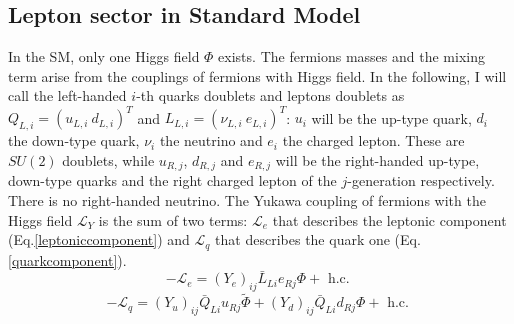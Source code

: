 \subsection{Lepton sector in Standard Model}\label{leptonsector}
In the SM, only one Higgs field $\Phi$ exists. The fermions masses and the mixing term arise from the couplings of fermions with Higgs field. In the following, I will call the left-handed $i$-th quarks doublets and leptons doublets as $Q_{L,i}=(u_{L,i} \ d_{L,i})^T$ and $L_{L,i}=(\nu_{L,i} \ e_{L,i})^T$: $u_i$ will be the up-type quark, $d_i$ the down-type quark, $\nu_i$ the neutrino and $e_i$ the charged lepton. These are $SU(2)$ doublets, while $u_{R,j}$, $d_{R,j}$ and $e_{R,j}$ will be the right-handed up-type, down-type quarks and the right charged lepton of the $j$-generation respectively. There is no right-handed neutrino. The Yukawa coupling of fermions with the Higgs field $\mathscr{L}_Y$ is the sum of two terms: $\mathscr{L}_e$ that describes the leptonic component (Eq.\ref{leptoniccomponent}) and $\mathscr{L}_q$ that describes the quark one (Eq.\ref{quarkcomponent}).
\begin{equation}\label{leptoniccomponent}
    -\mathscr{L}_e=\left(Y_e\right)_{i j} \bar{L}_{L i} e_{R j} \Phi+ \text{ h.c. }
\end{equation}
\begin{equation}\label{quarkcomponent}
        -\mathscr{L}_q=\left(Y_u\right)_{i j} \bar{Q}_{L i} u_{R j} \widetilde{\Phi}+\left(Y_d\right)_{i j} \bar{Q}_{L i} d_{R j} \Phi+\text { h.c. }
\end{equation}

